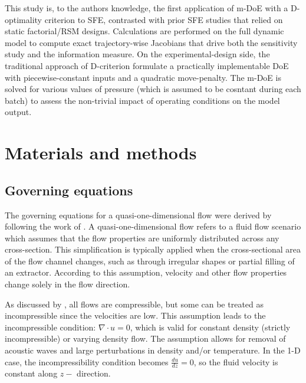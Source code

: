 \documentclass[a4paper,fleqn]{cas-dc}
\begin{document}
This study is, to the authors knowledge, the first application of m-DoE with a D-optimality criterion to SFE, contrasted with prior SFE studies that relied on static factorial/RSM designs. Calculations are performed on the full dynamic model to compute exact trajectory-wise Jacobians that drive both the sensitivity study and the information measure. On the experimental-design side, the traditional approach of D-criterion formulate a practically implementable DoE with piecewise-constant inputs and a quadratic move-penalty. The m-DoE is solved for various values of pressure (which is assumed to be cosntant during each batch) to assess the non-trivial impact of operating conditions on the model output.


%
\section{Materials and methods} \label{CH: Materials and methods}

\subsection{Governing equations} \label{CH:Governing_equations_chapter}
The governing equations for a quasi-one-dimensional flow were derived by following the work of \citet{Anderson1995}. A quasi-one-dimensional flow refers to a fluid flow scenario which assumes that the flow properties are uniformly distributed across any cross-section. This simplification is typically applied when the cross-sectional area of the flow channel changes, such as through irregular shapes or partial filling of an extractor. According to this assumption, velocity and other flow properties change solely in the flow direction.

As discussed by \citet{Anderson2023}, all flows are compressible, but some can be treated as incompressible since the velocities are low. This assumption leads to the incompressible condition: $\nabla \cdot u =0$, which is valid for constant density (strictly incompressible) or varying density flow. The assumption allows for removal of acoustic waves and large perturbations in density and/or temperature. In the 1-D case, the incompressibility condition becomes $\frac{du}{dz} = 0$, so the fluid velocity is constant along $z-$ direction.
\end{document}
